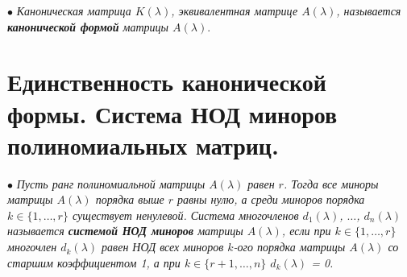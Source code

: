 $\bullet$ \textit{Каноническая матрица $K(\lambda)$, эквивалентная матрице $A(\lambda)$, называется \textbf{канонической формой} матрицы $A(\lambda)$}.















\section {Единственность канонической формы. Система НОД миноров полиномиальных матриц.}
$\bullet$ \textit{Пусть ранг полиномиальной матрицы $A(\lambda)$ равен $r$. Тогда все миноры матрицы $A(\lambda)$ порядка выше $r$ равны нулю, а среди миноров порядка $k \in \{1, \dots, r\}$ существует ненулевой. Система многочленов $d_1(\lambda)$, $\dots$, $d_n(\lambda)$ называется \textbf{системой НОД миноров} матрицы $A(\lambda)$, если при $k \in \{1, \dots, r\}$ многочлен $d_k(\lambda)$ равен НОД всех миноров $k$-ого порядка матрицы $A(\lambda)$ со старшим коэффициентом 1, а при $k \in \{r+1, \dots, n\}$ $d_k(\lambda)$ = 0.}
